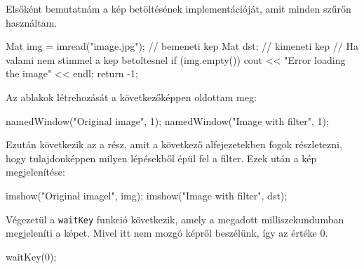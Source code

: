 Elsőként bemutatnám a kép betöltésének implementációját, amit minden szűrőn használtam.
\begin{cpp}
Mat img = imread("image.jpg"); // bemeneti kep
Mat dst; // kimeneti kep
// Ha valami nem stimmel a kep betoltesnel
if (img.empty()) {
    cout << "Error loading the image" << endl;
    return -1;
}
\end{cpp} 
Az ablakok létrehozását a következőképpen oldottam meg:
\begin{cpp}
namedWindow("Original image", 1);
namedWindow("Image with filter", 1);
\end{cpp}
Ezután következik az a rész, amit a következő alfejezetekben fogok részletezni, hogy tulajdonképpen milyen lépésekből épül fel a filter. Ezek után a kép megjelenítése:
\begin{cpp}
imshow("Original imagel", img);
imshow("Image with filter", dst);
\end{cpp} 
\newpage
\noindent Végezetül a \texttt{waitKey} funkció következik, amely a megadott milliszekundumban megjeleníti a képet. Mivel itt nem mozgó képről beszélünk, így az értéke 0.
\begin{cpp}
waitKey(0);
\end{cpp}


